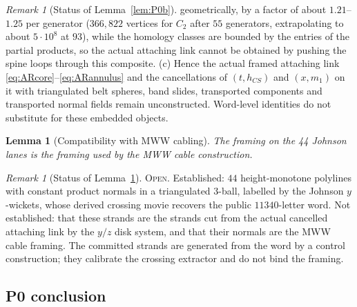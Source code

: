 \documentclass[11pt]{amsart}
\newtheorem{lemma}[theorem]{Lemma}
\theoremstyle{definition}
\theoremstyle{remark}
\newtheorem{remark}[theorem]{Remark}
\newcommand{\Open}{\textnormal{\textsc{Open}}}
\begin{document}
\begin{remark}[Status of Lemma~\ref{lem:P0b}]
geometrically, by a factor of about $1.21$--$1.25$ per generator
($366{,}822$ vertices for $C_2$ after $55$ generators, extrapolating to
about $5\cdot10^8$ at $93$), while the homology classes are bounded by
the entries of the partial products, so the actual attaching link cannot
be obtained by pushing the spine loops through this composite.  (c) Hence
the actual framed attaching link \eqref{eq:ARcore}--\eqref{eq:ARannulus}
and the cancellations of $(t,h_{CS})$ and $(x,m_1)$ on it with triangulated
belt spheres, band slides, transported components and transported normal
fields remain unconstructed.  Word-level identities do not substitute for
these embedded objects.
\end{remark}

\begin{lemma}[Compatibility with MWW cabling]\label{lem:P0c}
The framing on the 44 Johnson lanes is the framing used by the MWW cable
construction.
\end{lemma}

\begin{remark}[Status of Lemma~\ref{lem:P0c}]
\Open.  Established: $44$ height-monotone polylines with constant product
normals in a triangulated $3$-ball, labelled by the Johnson $y$-wickets,
whose derived crossing movie recovers the public $11340$-letter word.  Not
established: that these strands are the strands cut from the actual
cancelled attaching link by the $y/z$ disk system, and that their normals
are the MWW cable framing.  The committed strands are generated from the
word by a control construction; they calibrate the crossing extractor and
do not bind the framing.
\end{remark}

\subsection{P0 conclusion}\label{sec:p0-conclusion}
\end{document}
